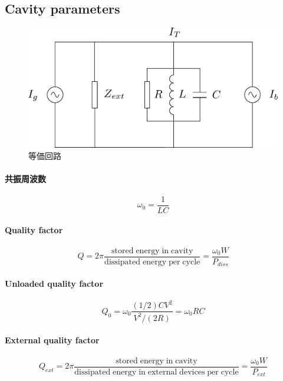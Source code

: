 \documentclass[book]{jlreq}
\begin{document}
\subsection{Cavity parameters}

\begin{figure}[hbt]
    \begin{center}
      \includegraphics[width=12cm,clip]{figs/Equivalent_Circuit}
      \caption{等価回路}
     \label{Equivalent_Circuit}
    \end{center}
\end{figure}
%
\paragraph{共振周波数}
%
\begin{equation}
    \omega_0 = \frac{1}{L C}
\end{equation}
%
\paragraph{Quality factor}
%
\begin{equation}
    Q = 2\pi \frac{\mathrm{stored\;energy\;in\;cavity}}{\mathrm{dissipated \; energy\;per\;cycle}} = \frac{\omega_0 W}{P_{diss}}
\end{equation}
%
\paragraph{Unloaded quality factor}
%
\begin{equation}
    Q_0 = \omega_0 \frac{(1/2) C V^2}{V^2/(2R)} = \omega_0 R C 
\end{equation}
%
\paragraph{External quality factor}
%
\begin{equation}
    Q_{ext} = 2\pi \frac{\mathrm{stored\;energy\;in\;cavity}}{\mathrm{dissipated \; energy\;in\;external\;devices\;per\;cycle}}
     = \frac{\omega_0 W}{P_{ext}}
\end{equation}
%
\end{document}
